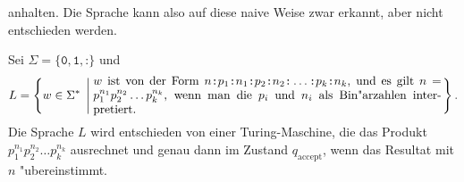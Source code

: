 \begin{loesung}
\begin{teilaufgaben}
anhalten. Die Sprache kann also auf diese naive Weise zwar erkannt, aber
nicht entschieden werden.
\item 
Sei $\Sigma=\{\texttt{0},\texttt{1},\texttt{:}\}$ und 
\[
L=\left\{ w\in\Sigma^*\;\left|\;
\begin{minipage}{4truein}
$w$ ist von der Form
$n\texttt{:}p_1\texttt{:}n_1\texttt{:}p_2\texttt{:}n_2\texttt{:}\dots\texttt{:}p_k\texttt{:}n_k$, und es gilt $n=p_1^{n_1}p_2^{n_2}\dots p_k^{n_k}$,
wenn man die $p_i$ und $n_i$ als Bin"arzahlen interpretiert.
\end{minipage}
\right.\right\}.
\]
Die Sprache $L$ wird entschieden von einer Turing-Maschine, die das Produkt
$p_1^{n_1}p_2^{n_2}\dots p_k^{n_k}$ ausrechnet und genau dann im Zustand
$q_{\text{accept}}$, wenn das Resultat mit $n$ "ubereinstimmt.
\qedhere
\end{teilaufgaben}
\end{loesung}

